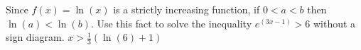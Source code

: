 {\label{onetoonelogexercise} Since $f(x) = \ln(x)$ is a strictly increasing function, if $0 < a < b$ then $\ln(a) < \ln(b)$. Use this fact to solve the inequality $e^{(3x - 1)} > 6$ without a sign diagram.}
{$x > \frac{1}{3}(\ln(6) + 1)$}